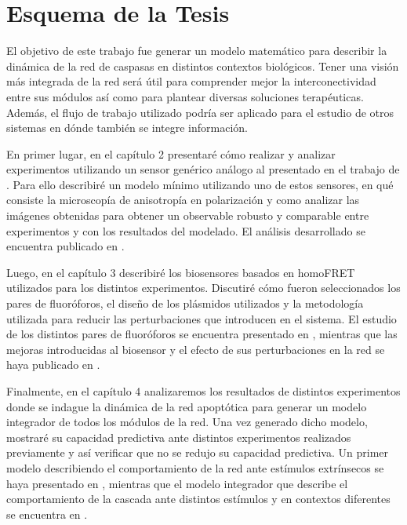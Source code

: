 \section{Esquema de la Tesis}

El objetivo de este trabajo fue generar un modelo matemático para describir la dinámica de la red de caspasas en distintos contextos biológicos. Tener una visión más integrada de la red será útil para comprender mejor la interconectividad entre sus módulos así como para plantear diversas soluciones terapéuticas. Además, el flujo de trabajo utilizado podría ser aplicado para el estudio de otros sistemas en dónde también se integre información.


En primer lugar, en el capítulo 2 presentaré cómo realizar y analizar experimentos utilizando un sensor genérico análogo al presentado en el trabajo de \cite{Stegemann2015}. Para ello describiré un modelo mínimo utilizando uno de estos sensores, en qué consiste la microscopía de anisotropía en polarización y como analizar las imágenes obtenidas para obtener un observable robusto y comparable entre experimentos y con los resultados del modelado. El análisis desarrollado se encuentra publicado en \cite{Corbat2018}.

Luego, en el capítulo 3 describiré los biosensores basados en homoFRET utilizados para los distintos experimentos. Discutiré cómo fueron seleccionados los pares de fluoróforos, el diseño de los plásmidos utilizados y la metodología utilizada para reducir las perturbaciones que introducen en el sistema. El estudio de los distintos pares de fluoróforos se encuentra presentado en \cite{Corbat2018}, mientras que las mejoras introducidas al biosensor y el efecto de sus perturbaciones en la red se haya publicado en \cite{Habif2021}.

Finalmente, en el capítulo 4 analizaremos los resultados de distintos experimentos donde se indague la dinámica de la red apoptótica para generar un modelo integrador de todos los módulos de la red. Una vez generado dicho modelo, mostraré su capacidad predictiva ante distintos experimentos realizados previamente y así verificar que no se redujo su capacidad predictiva. Un primer modelo describiendo el comportamiento de la red ante estímulos extrínsecos se haya presentado en \cite{Corbat2018}, mientras que el modelo integrador que describe el comportamiento de la cascada ante distintos estímulos y en contextos diferentes se encuentra en \cite{Corbat2021}.
